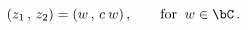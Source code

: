 \begin{equation}
\left(z_1\, , \, z_2\right) =
(w\, , \, c \: w)\,,
\qquad   \mathrm{for}\;\;w \in \bC\,.
\end{equation}

